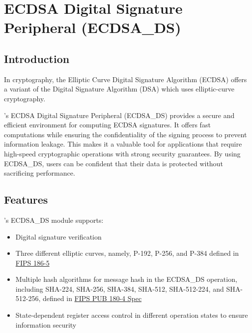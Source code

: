 \documentclass[main\_\_EN.tex]{subfiles}
\begin{document}

\ifglobal
\else
    {\let\clearpage\relax \listoftodos}
    {\let\clearpage\relax \listofdonetodos}
    \tableofcontents
\fi




\hypertarget{ecdsa}{}
\chapter{ECDSA Digital Signature Peripheral (ECDSA\_DS)}
\label{mod:ecdsa}



\section{Introduction}

In cryptography, the Elliptic Curve Digital Signature Algorithm (ECDSA) offers a variant of the Digital Signature Algorithm (DSA) which uses elliptic-curve cryptography.

\chipname{}'s ECDSA Digital Signature Peripheral (ECDSA\_DS) provides a secure and efficient environment for computing ECDSA signatures. It offers fast computations while ensuring the confidentiality of the signing process to prevent information leakage. This makes it a valuable tool for applications that require high-speed cryptographic operations with strong security guarantees. By using ECDSA\_DS, users can be confident that their data is protected without sacrificing performance.



\section{Features}
\label{sec:ecdsa-features}

\chipname{}'s ECDSA\_DS module supports:

\begin{itemize}
    \item Digital signature verification
    \item Three different elliptic curves, namely, P-192, P-256, and P-384 defined in \href{https://nvlpubs.nist.gov/nistpubs/FIPS/NIST.FIPS.186-5.pdf}{FIPS 186-5}
    \item Multiple hash algorithms for message hash in the ECDSA\_DS operation, including SHA-224, SHA-256, SHA-384, SHA-512, SHA-512-224, and SHA-512-256, defined in \href{https://doi.org/10.6028/NIST.FIPS.180-4}{FIPS PUB 180-4 Spec}
    \item State-dependent register access control in different operation states to ensure information security
\end{itemize}
\end{document}
